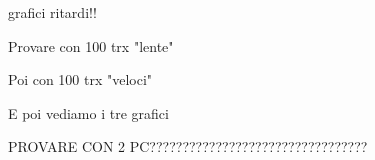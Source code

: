 grafici ritardi!!

Provare con 100 trx "lente"

Poi con 100 trx "veloci"

E poi vediamo i tre grafici

PROVARE CON 2 PC?????????????????????????????????